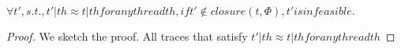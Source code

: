 \begin{mytheorem}[Maximality]
$\forall t', s.t., t'|th\approx t|th for any thread th, if t'\notin closure(t,\Phi), t' is infeasible.$
\end{mytheorem}

\begin{proof}
We sketch the proof. All traces that satisfy  $t'|th\approx t|th for any thread th$ 
\end{proof}



